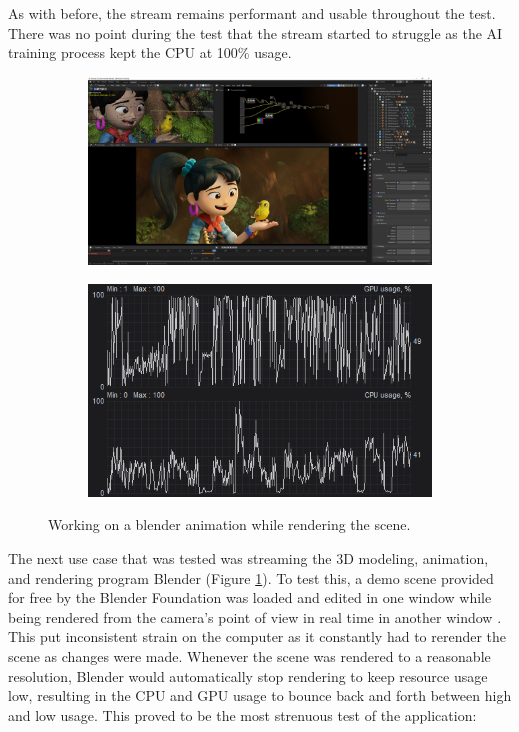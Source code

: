 As with before, the stream remains performant and usable throughout the test.
There was no point during the test that the stream started to struggle as the AI training process kept the CPU at 100\% usage.

\begin{figure}[t]
  \centering
  \begin{subfigure}{1\textwidth}
    \centering
    \includegraphics[width=.9\linewidth]{Figures/realworld/blender}
  \end{subfigure}
  \begin{subfigure}{1\textwidth}
    \centering
    \includegraphics[width=.5\linewidth]{Figures/realworld/blenderstats}
  \end{subfigure}
  \caption[Streaming a 3D modeling, animation, and rendering program]{Working on a blender animation while rendering the scene.}
  \label{fig:RealWorldBlender}
\end{figure}

The next use case that was tested was streaming the 3D modeling, animation, and rendering program Blender (Figure \ref{fig:RealWorldBlender}).
To test this, a demo scene provided for free by the Blender Foundation was loaded and edited in one window while being rendered from the camera's point of view in real time in another window \cite{BlenderDemoScene}.
This put inconsistent strain on the computer as it constantly had to rerender the scene as changes were made.
Whenever the scene was rendered to a reasonable resolution, Blender would automatically stop rendering to keep resource usage low, resulting in the CPU and GPU usage to bounce back and forth between high and low usage.
This proved to be the most strenuous test of the application:

